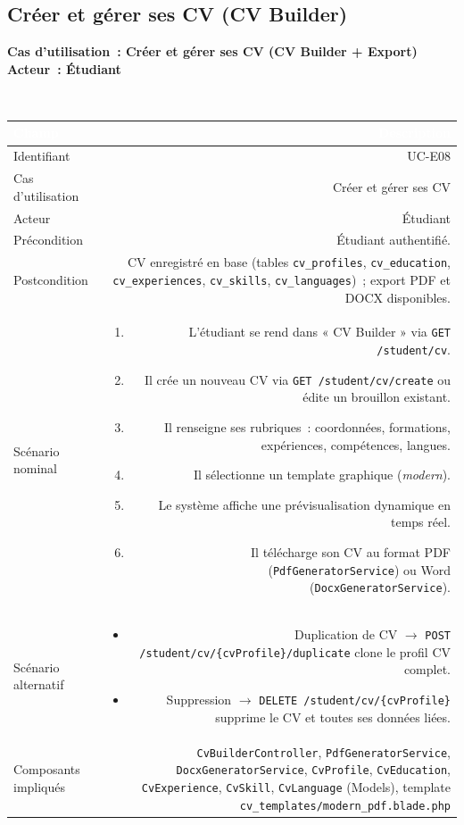\documentclass[a4paper,12pt]{article}
\newcommand{\ucheader}[2]{%
  \noindent\colorbox{capblue}{\parbox{\dimexpr\linewidth-2\fboxsep}{%
    \color{white}\bfseries\large Cas d'utilisation~: #1 \hfill \normalsize Acteur~: #2
  }}\\[2pt]
}
\begin{document}
\vspace{1em}

\subsection{Créer et gérer ses CV (CV Builder)}
\ucheader{Créer et gérer ses CV (CV Builder + Export)}{Étudiant}

\noindent
\begin{tabular}{|L|R|}
\hline
{}\textcolor{white}{\textbf{Champ}} & \textcolor{white}{\textbf{Description}} \\
\hline
{}Identifiant & UC-E08 \\
\hline
Cas d'utilisation & Créer et gérer ses CV \\
\hline
{}Acteur & Étudiant \\
\hline
Précondition & Étudiant authentifié. \\
\hline
{}Postcondition & CV enregistré en base (tables \texttt{cv\_profiles}, \texttt{cv\_education}, \texttt{cv\_experiences}, \texttt{cv\_skills}, \texttt{cv\_languages})~; export PDF et DOCX disponibles. \\
\hline
Scénario nominal &
\begin{enumerate}
  \item L'étudiant se rend dans « CV Builder » via \texttt{GET /student/cv}.
  \item Il crée un nouveau CV via \texttt{GET /student/cv/create} ou édite un brouillon existant.
  \item Il renseigne ses rubriques~: coordonnées, formations, expériences, compétences, langues.
  \item Il sélectionne un template graphique (\textit{modern}).
  \item Le système affiche une prévisualisation dynamique en temps réel.
  \item Il télécharge son CV au format PDF (\texttt{PdfGeneratorService}) ou Word (\texttt{DocxGeneratorService}).
\end{enumerate} \\
\hline
{}Scénario alternatif &
\begin{itemize}
  \item Duplication de CV $\rightarrow$ \texttt{POST /student/cv/\{cvProfile\}/duplicate} clone le profil CV complet.
  \item Suppression $\rightarrow$ \texttt{DELETE /student/cv/\{cvProfile\}} supprime le CV et toutes ses données liées.
\end{itemize} \\
\hline
Composants impliqués & \texttt{CvBuilderController}, \texttt{PdfGeneratorService}, \texttt{DocxGeneratorService}, \texttt{CvProfile}, \texttt{CvEducation}, \texttt{CvExperience}, \texttt{CvSkill}, \texttt{CvLanguage} (Models), template \texttt{cv\_templates/modern\_pdf.blade.php} \\
\hline
\end{tabular}
\end{document}
